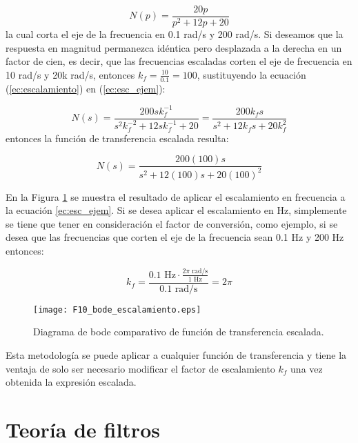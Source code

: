 	\begin{equation}
		N(p) = \frac{20p}{p^{2} + 12p + 20}
	\label{ec:esc_ejem}
	\end{equation}
	la cual corta el eje de la frecuencia en 0.1 rad/s y 200 rad/s. Si deseamos que la respuesta en magnitud permanezca idéntica pero desplazada a la derecha en un factor de cien, es decir, que las frecuencias escaladas corten el eje de frecuencia en 10 rad/s y 20k rad/s, entonces $k_{f} = \frac{10}{0.1} = 100$, sustituyendo la ecuación (\ref{ec:escalamiento}) en (\ref{ec:esc_ejem}):

	\begin{equation}
		N(s) = \frac{200sk_{f}^{-1}}{s^{2}k^{-2}_{f} + 12sk^{-1}_{f} + 20} = \frac{200k_{f}s}{s^{2} + 12 k_{f} s + 20 k^{2}_{f}}
	\end{equation}
	entonces la función de transferencia escalada resulta:

	\begin{equation}
		N(s)  = \frac{200(100)s}{s^{2} + 12(100)s + 20(100)^{2}}
	\end{equation}
	
	En la Figura \ref{fig:F10_bode_escalamiento} se muestra el resultado de aplicar el escalamiento en frecuencia a la ecuación \ref{ec:esc_ejem}. Si se desea aplicar el escalamiento en Hz, simplemente se tiene que tener en consideración el factor de conversión, como ejemplo, si se desea que las frecuencias que corten el eje de la frecuencia sean 0.1 Hz y 200 Hz entonces:
	
	\begin{equation}
		k_{f} = \frac{0.1 \,\,\mathrm{Hz} \cdot \frac{2 \pi \,\,\mathrm{rad/s}}{1 \,\,\mathrm{Hz}}}{0.1 \,\,\mathrm{rad/s}} = 2 \pi
	\end{equation}
	
	\begin{figure}[hbtp]
		\caption{Diagrama de bode comparativo de función de transferencia escalada.} 
		\label{fig:F10_bode_escalamiento}
		\centering
		\texttt{[image: F10\_bode\_escalamiento.eps]}
	\end{figure}
	
	Esta metodología se puede aplicar a cualquier función de transferencia y tiene la ventaja de solo ser necesario modificar el factor de escalamiento $k_{f}$ una vez obtenida la expresión escalada.
	\section{Teoría de filtros}
	
